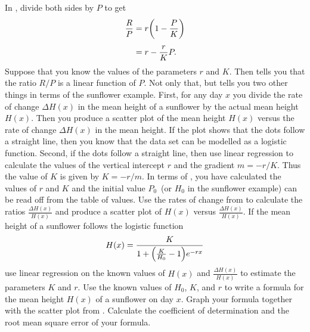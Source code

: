 \documentclass[a4paper,oneside,12pt]{article}
\begin{document}
\begin{problem}
\begin{packedenum}
  \item\label{subprob:logarithm:logistic_sunflower_rate_over_function_value}
    In , divide
    both sides by $P$ to get
    \begin{equation}
    \label{eqn:logarithm:logistic_differential_equation_linear_in_P}
    \begin{aligned}
    \frac{R}{P}
    &=
    r \parenthesis*{1 - \frac{P}{K}} \\[4pt]
    &=
    r - \frac{r}{K} P.
    \end{aligned}
    \end{equation}
    Suppose that you know the values of the parameters $r$ and $K$.
    Then
    tells you that the ratio $R / P$ is a linear function of $P$.  Not
    only that, but
    tells you two other things in terms of the sunflower example.
    First, for any day $x$ you divide the rate of change $\Delta H(x)$
    in the mean height of a sunflower by the actual mean height
    $H(x)$.  Then you produce a scatter plot of the mean height $H(x)$
    versus the rate of change $\Delta H(x)$ in the mean height.  If
    the plot shows that the dots follow a straight line, then you know
    that the data set can be modelled as a logistic function.  Second,
    if the dots follow a straight line, then use linear regression to
    calculate the values of the vertical intercept $r$ and the
    gradient $m = -r / K$.  Thus the value of $K$ is given by
    $K = -r / m$.  In terms of
    ,
    you have calculated the values of $r$ and $K$ and the initial
    value $P_0$~(or $H_0$ in the sunflower example) can be read off
    from the table of values.  Use the rates of change
    from  to
    calculate the ratios $\frac{\Delta H(x)}{H(x)}$ and produce a
    scatter plot of $H(x)$ versus $\frac{\Delta H(x)}{H(x)}$.  If the
    mean height of a sunflower follows the logistic function
    \begin{equation}
    \label{eqn:logarithm:logistic_sunflower_formula}
    H(x)
    =
    \frac{
      K
    }{
      1 + \parenthesis*{\frac{K}{H_0} - 1} e^{-rx}
    }
    \end{equation}
    use linear regression on the known values of $H(x)$ and
    $\frac{\Delta H(x)}{H(x)}$ to estimate the parameters $K$ and
    $r$.  Use the known values of $H_0$, $K$, and $r$ to write a
    formula for the mean height $H(x)$ of a sunflower on day $x$.
    Graph your formula together with the scatter plot
    from .  Calculate
    the coefficient of determination and the root mean square error of
    your formula.


\end{packedenum}
\end{problem}
\end{document}
